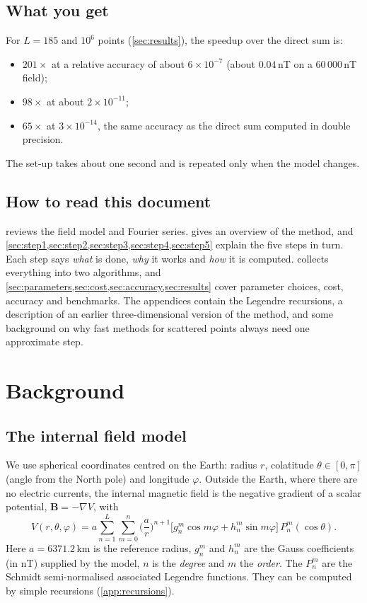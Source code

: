 \documentclass[11pt,a4paper]{article}
\theoremstyle{definition}
\begin{document}
\subsection{What you get}
For $L=185$ and $10^6$ points (\cref{sec:results}), the speedup over the direct sum is:
\begin{itemize}
\item $201\times$ at a relative accuracy of about $6\times10^{-7}$ (about $0.04$\,nT on a 60\,000\,nT field);
\item $98\times$ at about $2\times10^{-11}$;
\item $65\times$ at $3\times10^{-14}$, the same accuracy as the direct sum computed in double precision.
\end{itemize}
The set-up takes about one second and is repeated only when the model changes.

\subsection{How to read this document}
 reviews the field model and Fourier series.  gives an overview of the
method, and \cref{sec:step1,sec:step2,sec:step3,sec:step4,sec:step5} explain the five steps in turn. Each step says
\emph{what} is done, \emph{why} it works and \emph{how} it is computed.  collects everything into
two algorithms, and \cref{sec:parameters,sec:cost,sec:accuracy,sec:results} cover parameter choices, cost, accuracy and
benchmarks. The appendices contain the Legendre recursions, a description of an earlier three-dimensional version of
the method, and some background on why fast methods for scattered points always need one approximate step.

\section{Background}\label{sec:background}

\subsection{The internal field model}\label{sec:model}
We use spherical coordinates centred on the Earth: radius $r$, colatitude $\theta\in[0,\pi]$ (angle from the North
pole) and longitude $\varphi$. Outside the Earth, where there are no electric currents, the internal magnetic field
is the negative gradient of a scalar potential, $\mathbf B=-\nabla V$, with
\begin{equation}\label{eq:V}
V(r,\theta,\varphi)=a\sum_{n=1}^{L}\sum_{m=0}^{n}\Big(\frac ar\Big)^{n+1}
\big[g_n^m\cos m\varphi+h_n^m\sin m\varphi\big]\,P_n^m(\cos\theta).
\end{equation}
Here $a=6371.2$\,km is the reference radius, $g_n^m$ and $h_n^m$ are the Gauss coefficients (in nT) supplied by the
model, $n$ is the \emph{degree} and $m$ the \emph{order}. The $P_n^m$ are the Schmidt semi-normalised associated
Legendre functions. They can be computed by simple recursions (\cref{app:recursions}).
\end{document}

